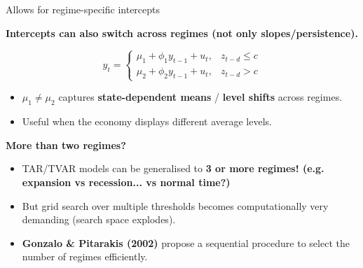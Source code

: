 \documentclass{beamer}
\begin{document}
\begin{frame}{Allows for regime-specific intercepts}
\small

\textbf{Intercepts can also switch across regimes (not only slopes/persistence).}

\[
y_t =
\begin{cases}
\mu_1 + \phi_1 y_{t-1} + u_t, & z_{t-d} \le c \\[0.2em]
\mu_2 + \phi_2 y_{t-1} + u_t, & z_{t-d} > c
\end{cases}
\]

\begin{itemize}
  \item $\mu_1 \neq \mu_2$ captures \textbf{state-dependent means} /
        \textbf{level shifts} across regimes.
  \item Useful when the economy displays different average levels.
\end{itemize}

\medskip

\textbf{More than two regimes?}
\begin{itemize}
  \item TAR/TVAR models can be generalised to \textbf{3 or more regimes! (e.g. expansion vs recession... vs normal time?)}
  \item But grid search over multiple thresholds becomes computationally very demanding (search space explodes).
  \item \textbf{Gonzalo \& Pitarakis (2002)} propose a sequential procedure to select the number of regimes efficiently.
\end{itemize}

\end{frame}
\end{document}
